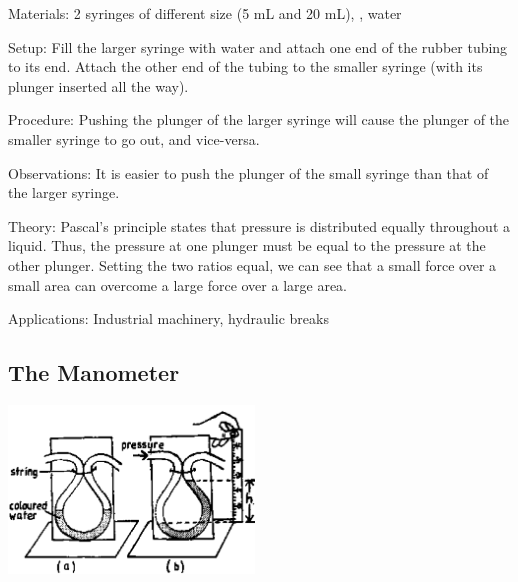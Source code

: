 \begin{multicols}{2}
\begin{description*}
\item[Materials:]{2 syringes of different size (5 mL and 20 mL), , water}
\item[Setup:]{Fill the larger syringe with water and attach one end of the rubber tubing to its end. Attach the other end of the tubing to the smaller syringe (with its plunger inserted all the way).}
\item[Procedure:]{Pushing the plunger of the larger syringe will cause the plunger of the smaller syringe to go out, and vice-versa.}
\item[Observations:]{It is easier to push the plunger of the small syringe than that of the larger syringe.}
\item[Theory:]{Pascal's principle states that pressure is distributed equally throughout a liquid. Thus, the pressure at one plunger must be equal to the pressure at the other plunger. Setting the two ratios equal, we can see that a small force over a small area can overcome a large force over a large area.}
\item[Applications:]{Industrial machinery, hydraulic breaks}
\end{description*}

\subsection{The Manometer}

\begin{center}
\includegraphics[width=0.49\textwidth]{./img/source/manometer.png}
\end{center}


\end{multicols}
